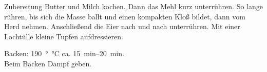 \vspace{0.5cm}

\begin{recipestep}
  {Zubereitung}
  Butter und Milch kochen. Dann das Mehl kurz unterrühren. So lange rühren, bis sich
  die Masse ballt und einen kompakten Kloß bildet, dann vom Herd nehmen. Anschließend
  die Eier nach und nach unterrühren. Mit einer Lochtülle kleine Tupfen aufdressieren.

  Backen: \SI{190}{\degree\celsius} ca. \SIrange{15}{20}{\minute}.\\
  Beim Backen Dampf geben.
\end{recipestep}
